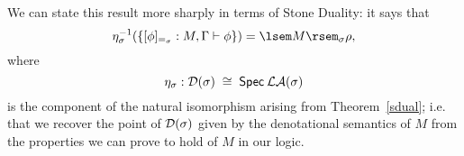 We can state this result more sharply in terms of Stone Duality: it says
that
\[ \eta_{\sigma}^{-1}(\{ [\phi ]_{=_{\sigma}} :  M, \Gamma \vdash \phi \}) = 
\lsem M \rsem_{\sigma} \rho , \]
where 
\[ \eta_{\sigma} : {\cal D}(\sigma ) \; \cong \; {\sf Spec} \: {\cal LA}(\sigma ) \]
is the component of the natural isomorphism arising from Theorem~\ref{sdual};
i.e. that we recover the point of ${\cal D}(\sigma )$ given by the 
denotational semantics
of $M$ from the properties we can prove to hold of $M$ in our logic.
